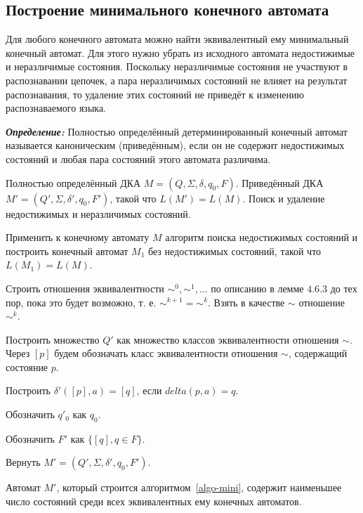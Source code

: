 \subsection*{Построение минимального конечного автомата}
Для любого конечного автомата можно найти эквивалентный ему минимальный конечный автомат. Для этого нужно убрать из исходного автомата недостижимые и неразличимые состояния. Поскольку неразличимые состояния не участвуют в распознавании цепочек, а пара неразличимых состояний не влияет на результат распознавания, то удаление этих состояний не приведёт к изменению распознаваемого языка.

\textbf{\textit{Определение:}} Полностью определённый детерминированный конечный автомат называется каноническим (приведённым), если он не содержит недостижимых состояний и любая пара состояний этого автомата различима.

{
	Полностью определённый ДКА $M = (Q,\Sigma, \delta, q_0, F)$.
}
{
	Приведённый ДКА $M' = (Q',\Sigma, \delta', q_0, F')$, такой что $L(M') = L(M)$.
}
{
	Поиск и удаление недостижимых и неразличимых состояний.
}
{
\item Применить к конечному автомату $M$ алгоритм поиска недостижимых состояний и построить конечный автомат $M_1$ без недостижимых состояний, такой что $L(M_1) = L(M)$.
\item Строить отношения эквивалентности $\sim^0, \sim^1, \ldots $ по описанию в лемме $4.6.3$ до тех пор, пока это будет возможно, т. е. $\sim^{k+1} = \sim^{k}$. Взять в качестве $\sim$ отношение $\sim^k$.
\item Построить множество $Q'$ как множество классов эквивалентности отношения $\sim$. Через $[p]$ будем обозначать класс эквивалентности отношения $\sim$, содержащий состояние $p$.
\item Построить $\delta'([p], a) = [q]$, если $delta(p,a) = q$.
\item Обозначить $q'_0$ как $q_0$.
\item Обозначить $F'$ как $\{ [q], q \in F \}$.
\item Вернуть  $M' = (Q',\Sigma, \delta', q_0, F')$.
}

\begin{mytheorem}
Автомат $M'$, который строится алгоритмом~\ref{algo-mini}, содержит наименьшее число состояний среди всех эквивалентных ему конечных автоматов.
\end{mytheorem}

